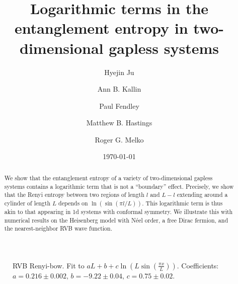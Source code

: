 \documentclass[prl,aps,twocolumn,floatfix,amsmath,amssymb,superscriptaddress,tightenlines]{revtex4}
\begin{document}
\date{\today}
\title{Logarithmic terms in the entanglement entropy in
  two-dimensional gapless systems}

\author{Hyejin Ju}

\author{Ann B. Kallin}

\author{Paul Fendley}

\author{Matthew B. Hastings}

\author{Roger G. Melko}

\begin{abstract} 
We show that the entanglement entropy of a variety of two-dimensional
gapless systems contains a logarithmic term that is not a ``boundary''
effect. Precisely, we show that the Renyi entropy between two regions
of length $l$ and $L-l$ extending around a cylinder of length $L$ depends on
$\ln(\sin(\pi l/L))$. This logarithmic term is thus akin to that
appearing in 1d systems with conformal symmetry. We illustrate this
with numerical results on the Heisenberg model with N\'eel order, a
free Dirac fermion, and the nearest-neighbor RVB wave function.


 
\end{abstract}
\maketitle


\begin{figure}[h]
  \begin{center}
  \end{center}
  \caption{RVB Renyi-bow. Fit to $a L + b + c \ln \left( L \sin \left( \frac{\pi
 x}{L} \right) \right).$ Coefficients: $a = 0.216\pm 0.002, \, b = -9.22 \pm 0.0
4, \, c = 0.75\pm 0.02$.}
  \label{fig:1}
\end{figure}
\end{document}

